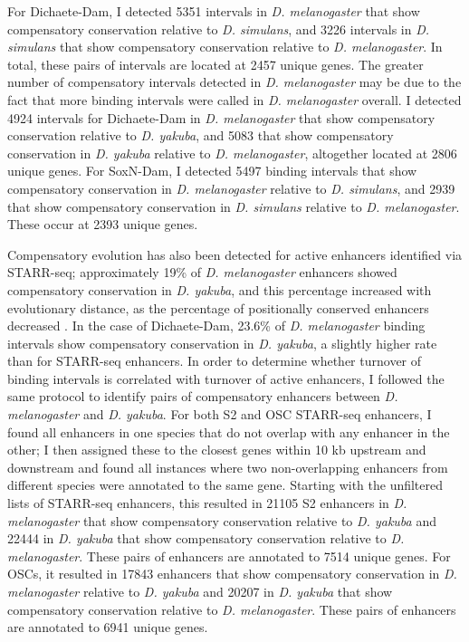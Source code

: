 For Dichaete-Dam, I detected 5351 intervals in \emph{D. melanogaster} that show compensatory conservation relative to \emph{D. simulans}, and 3226 intervals in \emph{D. simulans} that show compensatory conservation relative to \emph{D. melanogaster}. In total, these pairs of intervals are located at 2457 unique genes. The greater number of compensatory intervals detected in \emph{D. melanogaster} may be due to the fact that more binding intervals were called in \emph{D. melanogaster} overall. I detected 4924 intervals for Dichaete-Dam in \emph{D. melanogaster} that show compensatory conservation relative to \emph{D. yakuba}, and 5083 that show compensatory conservation in \emph{D. yakuba} relative to \emph{D. melanogaster}, altogether located at 2806 unique genes. For SoxN-Dam, I detected 5497 binding intervals that show compensatory conservation in \emph{D. melanogaster} relative to \emph{D. simulans}, and 2939 that show compensatory conservation in \emph{D. simulans} relative to \emph{D. melanogaster}. These occur at 2393 unique genes.

Compensatory evolution has also been detected for active enhancers identified via STARR-seq; approximately 19\% of \emph{D. melanogaster} enhancers showed compensatory conservation in \emph{D. yakuba}, and this percentage increased with evolutionary distance, as the percentage of positionally conserved enhancers decreased \citep{arnold_quantitative_2014}. In the case of Dichaete-Dam, 23.6\% of \emph{D. melanogaster} binding intervals show compensatory conservation in \emph{D. yakuba}, a slightly higher rate than for STARR-seq enhancers. In order to determine whether turnover of binding intervals is correlated with turnover of active enhancers, I followed the same protocol to identify pairs of compensatory enhancers between \emph{D. melanogaster} and \emph{D. yakuba}. For both S2 and OSC STARR-seq enhancers, I found all enhancers in one species that do not overlap with any enhancer in the other; I then assigned these to the closest genes within 10 kb upstream and downstream and found all instances where two non-overlapping enhancers from different species were annotated to the same gene. Starting with the unfiltered lists of STARR-seq enhancers, this resulted in 21105 S2 enhancers in \emph{D. melanogaster} that show compensatory conservation relative to \emph{D. yakuba} and 22444 in \emph{D. yakuba} that show compensatory conservation relative to \emph{D. melanogaster}. These pairs of enhancers are annotated to 7514 unique genes. For OSCs, it resulted in 17843 enhancers that show compensatory conservation in \emph{D. melanogaster} relative to \emph{D. yakuba} and 20207 in \emph{D. yakuba} that show compensatory conservation relative to \emph{D. melanogaster}. These pairs of enhancers are annotated to 6941 unique genes.

